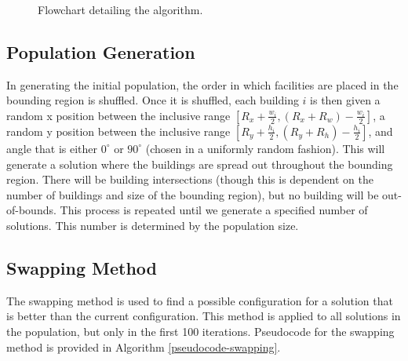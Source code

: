 \begin{figure}[h!]
	\caption{Flowchart detailing the algorithm.}
	\label{algo-flowchart}
\end{figure}

\subsection{Population Generation}
In generating the initial population, the order in which facilities are placed in the bounding region is shuffled. Once it is shuffled, each building $i$ is then given a random x position between the inclusive range $\left [ R_{x} + \frac{w_{i}}{2}, (R_{x} + R_{w}) - \frac{w_{i}}{2} \right ]$, a random y position between the inclusive range $\left [ R_{y} + \frac{h_{i}}{2}, (R_{y} + R_{h})  - \frac{h_{i}}{2} \right ]$, and angle that is either $0^{\circ}$ or $90^{\circ}$ (chosen in a uniformly random fashion). This will generate a solution where the buildings are spread out throughout the bounding region. There will be building intersections (though this is dependent on the number of buildings and size of the bounding region), but no building will be out-of-bounds. This process is repeated until we generate a specified number of solutions. This number is determined by the population size.

\subsection{Swapping Method}
The swapping method is used to find a possible configuration for a solution that is better than the current configuration. This method is applied to all solutions in the population, but only in the first 100 iterations. Pseudocode for the swapping method is provided in Algorithm \ref{pseudocode-swapping}.

